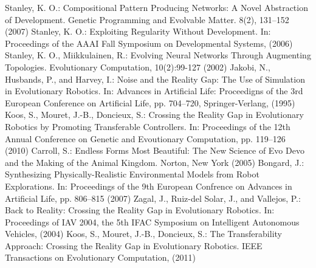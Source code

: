 Stanley, K. O.:
Compositional Pattern Producing Networks: A Novel Abstraction of Development.
Genetic Programming and Evolvable Matter. 8(2), 131--152 (2007)
%
Stanley, K. O.:
Exploiting Regularity Without Development.
In: Proceedings of the AAAI Fall Symposium on Developmental Systems, (2006)
%
Stanley, K. O., Miikkulainen, R.:
Evolving Neural Networks Through Augmenting Topologies.
Evolutionary Computation, 10(2):99-127 (2002)
%
Jakobi, N., Husbands, P., and Harvey, I.:
Noise and the Reality Gap: The Use of Simulation in Evolutionary Robotics.
In: Advances in Artificial Life: Proceedigns of the 3rd European Conference on Artificial Life, pp. 704--720, Springer-Verlang, (1995)
Koos, S., Mouret, J.-B., Doncieux, S.:
Crossing the Reality Gap in Evolutionary Robotics by Promoting Transferable Controllers.
In: Proceedings of the 12th Annual Conference on Genetic and Evoutionary Computation, pp. 119--126 (2010)
%
Carroll, S.:
Endless Forms Most Beautiful: The New Science of Evo Devo and the Making of the Animal Kingdom.
Norton, New York (2005)
%
Bongard, J.:
Synthesizing Physically-Realistic Environmental Models from Robot Explorations.
In: Proceedings of the 9th European Confrence on Advances in Artificial Life, pp. 806--815 (2007)
%
Zagal, J., Ruiz-del Solar, J., and Vallejos, P.:
Back to Reality: Crossing the Reality Gap in Evolutionary Robotics.
In: Proceedings of IAV 2004, the 5th IFAC Symposium on Intelligent Autonomous Vehicles, (2004)
%
Koos, S., Mouret, J.-B., Doncieux, S.:
The Transferability Approach: Crossing the Reality Gap in Evolutionary Robotics.
IEEE Transactions on Evolutionary Computation, (2011)
